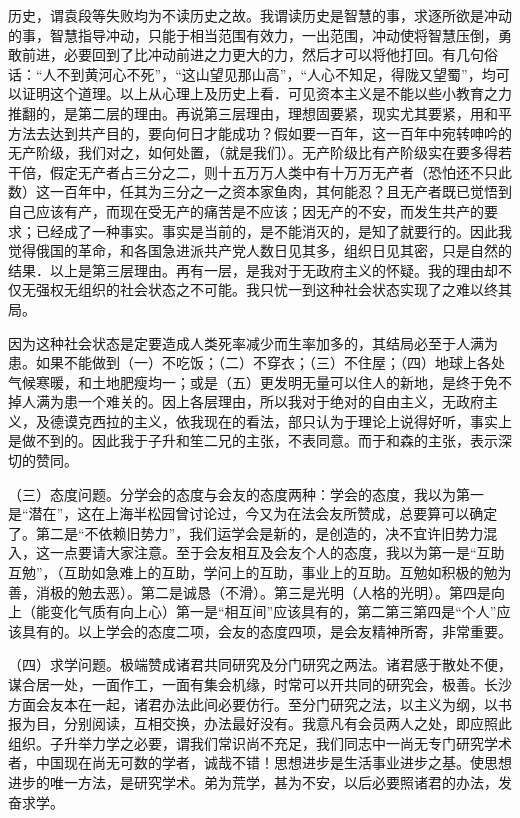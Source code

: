 历史，谓袁段等失败均为不读历史之故。我谓读历史是智慧的事，求逐所欲是冲动的事，智慧指导冲动，只能于相当范围有效力，一出范围，冲动使将智慧压倒，勇敢前进，必要回到了比冲动前进之力更大的力，然后才可以将他打回。有几句俗话：“人不到黄河心不死”，“这山望见那山高”，“人心不知足，得陇又望蜀”，均可以证明这个道理。以上从心理上及历史上看．可见资本主义是不能以些小教育之力推翻的，是第二层的理由。再说第三层理由，理想固要紧，现实尤其要紧，用和平方法去达到共产目的，要向何日才能成功？假如要一百年，这一百年中宛转呻吟的无产阶级，我们对之，如何处置，（就是我们）。无产阶级比有产阶级实在要多得若干倍，假定无产者占三分之二，则十五万万人类中有十万万无产者（恐怕还不只此数）这一百年中，任其为三分之一之资本家鱼肉，其何能忍？且无产者既已觉悟到自己应该有产，而现在受无产的痛苦是不应该；因无产的不安，而发生共产的要求；已经成了一种事实。事实是当前的，是不能消灭的，是知了就要行的。因此我觉得俄国的革命，和各国急进派共产党人数日见其多，组织日见其密，只是自然的结果．以上是第三层理由。再有一层，是我对于无政府主义的怀疑。我的理由却不仅无强权无组织的社会状态之不可能。我只忧一到这种社会状态实现了之难以终其局。

因为这种社会状态是定要造成人类死率减少而生率加多的，其结局必至于人满为患。如果不能做到（一）不吃饭；（二）不穿衣；（三）不住屋；（四）地球上各处气候寒暖，和土地肥瘦均一；或是（五）更发明无量可以住人的新地，是终于免不掉人满为患一个难关的。因上各层理由，所以我对于绝对的自由主义，无政府主义，及德谟克西拉的主义，依我现在的看法，部只认为于理论上说得好听，事实上是做不到的。因此我于子升和笙二兄的主张，不表同意。而于和森的主张，表示深切的赞同。

（三）态度问题。分学会的态度与会友的态度两种：学会的态度，我以为第一是“潜在”，这在上海半松园曾讨论过，今又为在法会友所赞成，总要算可以确定了。第二是“不依赖旧势力”，我们运学会是新的，是创造的，决不宜许旧势力混入，这一点要请大家注意。至于会友相互及会友个人的态度，我以为第一是“互助互勉”，（互助如急难上的互助，学问上的互助，事业上的互助。互勉如积极的勉为善，消极的勉去恶）。第二是诚恳（不滑）。第三是光明（人格的光明）。第四是向上（能变化气质有向上心）第一是“相互间”应该具有的，第二第三第四是“个人”应该具有的。以上学会的态度二项，会友的态度四项，是会友精神所寄，非常重要。

（四）求学问题。极端赞成诸君共同研究及分门研究之两法。诸君感于散处不便，谋合居一处，一面作工，一面有集会机缘，时常可以开共同的研究会，极善。长沙方面会友本在一起，诸君办法此间必要仿行。至分门研究之法，以主义为纲，以书报为目，分别阅读，互相交换，办法最好没有。我意凡有会员两人之处，即应照此组织。子升举力学之必要，谓我们常识尚不充足，我们同志中一尚无专门研究学术者，中国现在尚无可数的学者，诚哉不错！思想进步是生活事业进步之基。使思想进步的唯一方法，是研究学术。弟为荒学，甚为不安，以后必要照诸君的办法，发奋求学。

